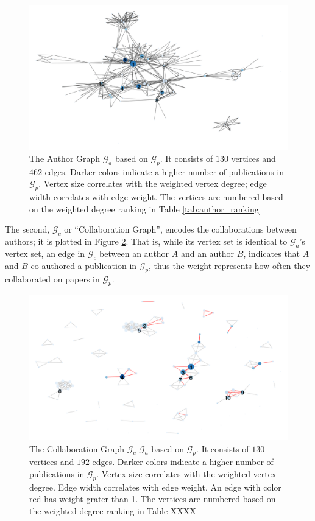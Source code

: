 \documentclass[11pt,a4paper]{book}
\theoremstyle{definition}
\theoremstyle{definition}
\theoremstyle{definition}
\theoremstyle{remark}
\newcommand{\pgraph}{\mathcal{G}_{p}}
\newcommand{\agraph}{\mathcal{G}_{a}}
\newcommand{\cgraph}{\mathcal{G}_{c}}
\begin{document}
\begin{figure}[h!]
\includegraphics[width=\textwidth]{author_graph.png}
\caption{The Author Graph  $\agraph$ based on $\pgraph$. It consists of  $130$ vertices and $462$ edges. 
Darker colors indicate a higher number of publications in $\pgraph$. Vertex size correlates with the weighted vertex degree; 
edge width correlates with edge weight. The vertices are numbered based on the weighted degree ranking in Table \ref{tab:author_ranking}}
\label{fig:agraph-actual_graph}
\end{figure}


The second, $\cgraph$ or ``Collaboration Graph'', encodes the collaborations between authors; it is plotted in Figure \ref{fig:cgraph-actual_graph}. That is, while its vertex set is identical to $\agraph$'s vertex set, an edge in $\cgraph$ between an author $A$ and an author $B$, indicates that $A$ and $B$ co-authored a publication in $\pgraph$, thus the weight represents how often they collaborated on papers in $\pgraph$. 



\begin{figure}[h!]
\includegraphics[width=\textwidth]{collab_graph.png}
\caption{The Collaboration Graph  $\cgraph$ $\agraph$ based on $\pgraph$. It consists of  $130$ vertices and $192$ edges. 
Darker colors indicate a higher number of publications in $\pgraph$. Vertex size correlates with the weighted vertex degree.
Edge width correlates with edge weight. An edge with color red has weight grater than 1. The vertices are numbered based on the weighted degree ranking in Table XXXX}
\label{fig:cgraph-actual_graph}
\end{figure}
\end{document}
